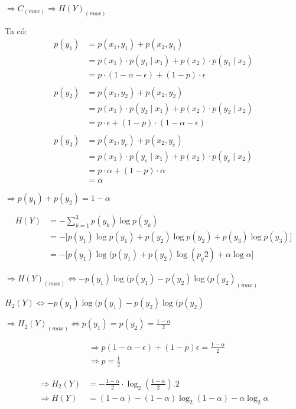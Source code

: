 \documentclass[12pt]{article}
\begin{document}
$\Rightarrow C_(max) \Rightarrow H(Y)_(max)$

Ta có:
\[
\begin{aligned}
p(y_1) &= p(x_1, y_1) + p(x_2, y_1) \\
       &= p(x_1) \cdot p(y_1 \mid x_1) + p(x_2) \cdot p(y_1 \mid x_2) \\
       &= p \cdot (1 - \alpha - \epsilon) + (1 - p) \cdot \epsilon \\
\\
p(y_2) &= p(x_1, y_2) + p(x_2, y_2) \\
       &= p(x_1) \cdot p(y_2 \mid x_1) + p(x_2) \cdot p(y_2 \mid x_2) \\
       &= p \cdot \epsilon + (1 - p) \cdot (1 - \alpha - \epsilon) \\
\\
p(y_3) &= p(x_1, y_e) + p(x_2, y_e) \\
       &= p(x_1) \cdot p(y_e \mid x_1) + p(x_2) \cdot p(y_e \mid x_2) \\
       &= p \cdot \alpha + (1 - p) \cdot \alpha \\
       &= \alpha
\end{aligned}
\]

$\Rightarrow p(y_1)+p(y_2)=1-\alpha$

\[
\begin{aligned}
H(Y) &= -\sum_{k=1}^{3} p(y_k) \log p(y_k) \\
     &= - \Big[ 
         p(y_1) \log p(y_1)
       + p(y_2) \log p(y_2)
       + p(y_3) \log p(y_3)
     \Big] \\
     &= - \Big[
      p(y_1)\log(p(y_1)+p(y_2)\log(p_y2)+  
      \alpha \log \alpha
     \Big]
\end{aligned}
\]

$\Rightarrow H(Y)_(max) \Leftrightarrow -p(y_1)\log(p(y_1)-p(y_2)\log(p(y_2)_(max)$

$H_2(Y) \Leftrightarrow -p(y_1)\log(p(y_1)-p(y_2)\log(p(y_2)$

$\Rightarrow H_2(Y)_(max) \Leftrightarrow p(y_1)=p(y_2)=\frac{1-\alpha}{2} $

\[
\begin{aligned}
&\Rightarrow p(1 - \alpha - \epsilon) + (1 - p)\epsilon = \frac{1 - \alpha}{2} \\
&\Rightarrow p=\frac{1}{2}
\end{aligned}
\]

\[
\begin{aligned}
\Rightarrow H_2(Y) &= -\frac{1 - \alpha}{2} \cdot \log_2\left(\frac{1 - \alpha}{2}\right).2 \\
\Rightarrow H(Y) &= (1 - \alpha) - (1 - \alpha) \log_2(1 - \alpha) - \alpha \log_2 \alpha
\end{aligned}
\]
\end{document}
